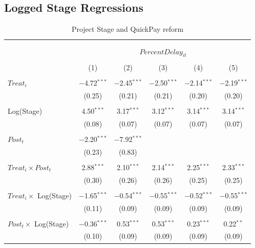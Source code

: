 \documentclass[
]{article}
\begin{document}
\hypertarget{logged-stage-regressions}{%
\subsection{Logged Stage Regressions}\label{logged-stage-regressions}}

\begin{table}[H] \centering 
  \caption{Project Stage and QuickPay reform} 
  \label{} 
\small 
\begin{tabular}{@{\extracolsep{-2pt}}lccccc} 
\\[-1.8ex]\hline 
\hline \\[-1.8ex] 
\\[-1.8ex] & \multicolumn{5}{c}{$PercentDelay_{it}$  } \\ 
\\[-1.8ex] & (1) & (2) & (3) & (4) & (5)\\ 
\hline \\[-1.8ex] 
 $Treat_i$ & $-$4.72$^{***}$ & $-$2.45$^{***}$ & $-$2.50$^{***}$ & $-$2.14$^{***}$ & $-$2.19$^{***}$ \\ 
  & (0.25) & (0.21) & (0.21) & (0.20) & (0.20) \\ 
  & & & & & \\ 
 Log(Stage) & 4.50$^{***}$ & 3.17$^{***}$ & 3.12$^{***}$ & 3.14$^{***}$ & 3.14$^{***}$ \\ 
  & (0.08) & (0.07) & (0.07) & (0.07) & (0.07) \\ 
  & & & & & \\ 
 $Post_t$ & $-$2.20$^{***}$ & $-$7.92$^{***}$ &  &  &  \\ 
  & (0.23) & (0.83) &  &  &  \\ 
  & & & & & \\ 
 $Treat_i \times Post_t$ & 2.88$^{***}$ & 2.10$^{***}$ & 2.14$^{***}$ & 2.25$^{***}$ & 2.33$^{***}$ \\ 
  & (0.30) & (0.26) & (0.26) & (0.25) & (0.25) \\ 
  & & & & & \\ 
 $Treat_i \times$ Log(Stage) & $-$1.65$^{***}$ & $-$0.54$^{***}$ & $-$0.55$^{***}$ & $-$0.52$^{***}$ & $-$0.55$^{***}$ \\ 
  & (0.11) & (0.09) & (0.09) & (0.09) & (0.09) \\ 
  & & & & & \\ 
 $Post_t \times$ Log(Stage) & $-$0.36$^{***}$ & 0.53$^{***}$ & 0.53$^{***}$ & 0.23$^{***}$ & 0.22$^{**}$ \\ 
  & (0.10) & (0.09) & (0.09) & (0.09) & (0.09) \\ 

\end{tabular}
\end{table}
\end{document}
